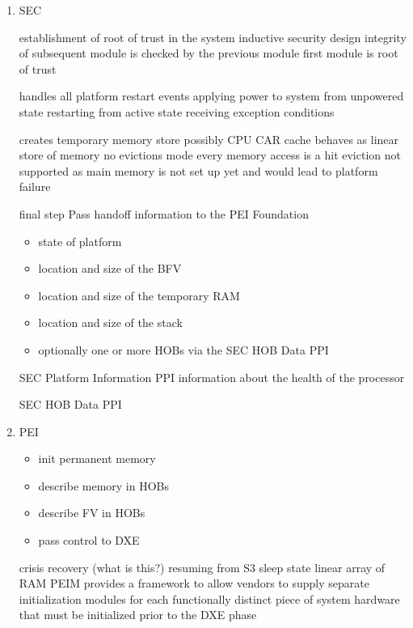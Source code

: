 \begin{enumerate}
    \item{\acf{SEC}}

    establishment of root of trust in the system
    inductive security design
    integrity of subsequent module is checked by the previous module
    first module is root of trust

    handles all platform restart events
    applying power to system from unpowered state
    restarting from active state
    receiving exception conditions

    creates temporary memory store
    possibly CPU \ac{CAR}
    cache behaves as linear store of memory
    no evictions mode
    every memory access is a hit
    eviction not supported as main memory is not set up yet and would lead to platform failure


    final step
    Pass handoff information to the \ac{PEI} Foundation
    \begin{itemize}
        \item state of platform
        \item location and size of the \ac{BFV}
        \item location and size of the temporary RAM
        \item location and size of the stack
        \item optionally one or more \acp{HOB} via the \ac{SEC} \ac{HOB} Data \ac{PPI}
    \end{itemize}

    SEC Platform Information PPI
    information about the health of the processor

    SEC HOB Data PPI

    \item{\acf{PEI}}

    \begin{itemize}
        \item init permanent memory
        \item describe memory in \acp{HOB}
        \item describe \ac{FV} in \acp{HOB}
        \item pass control to \ac{DXE}
    \end{itemize}

    crisis recovery (what is this?)
    resuming from S3 sleep state
    linear array of RAM
    \ac{PEIM} provides a framework to allow vendors to supply separate initialization modules for
    each functionally distinct piece of system hardware that must be initialized prior to the DXE phase \cite{pi-spec}


\end{enumerate}
